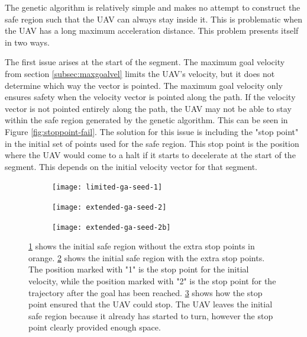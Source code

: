The genetic algorithm is relatively simple and makes no attempt to construct the safe region such that the UAV can always stay inside it. This is problematic when the UAV has a long maximum acceleration distance. This problem presents itself in two ways.
\par
The first issue arises at the start of the segment. The maximum goal velocity from section \ref{subsec:maxgoalvel} limits the UAV's velocity, but it does not determine which way the vector is pointed. The maximum goal velocity only ensures safety when the velocity vector is pointed along the path. If the velocity vector is not pointed entirely along the path, the UAV may not be able to stay within the safe region generated by the genetic algorithm. This can be seen in Figure \ref{fig:stoppoint-fail}. The solution for this issue is including the "stop point" in the initial set of points used for the safe region. This stop point is the position where the UAV would come to a halt if it starts to decelerate at the start of the segment. This depends on the initial velocity vector for that segment.
\par
\begin{figure}
	\centering
	\begin{subfigure}[t]{0.30\columnwidth}
        		\texttt{[image: limited-ga-seed-1]}
        		\caption{}
        		\label{fig:ga-seed-without}
	\end{subfigure}
	\hfill
	\begin{subfigure}[t]{0.30\columnwidth}
        		\texttt{[image: extended-ga-seed-2]}
        		\caption{}
        		 \label{fig:ga-seed-with}
	\end{subfigure}	
	\hfill
	\begin{subfigure}[t]{0.30\columnwidth}
        		\texttt{[image: extended-ga-seed-2b]}
        		\caption{}
        		 \label{fig:ga-seed-nomaxvela}
	\end{subfigure}		
	\caption[The effect of the inclusion of stop points on the initial convex safe region.]{\ref{fig:ga-seed-without} shows the initial safe region without the extra stop points in orange. \ref{fig:ga-seed-with} shows the initial safe region with the extra stop points. The position marked with "1" is the stop point for the initial velocity, while the position marked with "2" is the stop point for the trajectory after the goal has been reached. \ref{fig:ga-seed-nomaxvela} shows how the stop point ensured that the UAV could stop. The UAV leaves the initial safe region because it already has started to turn, however the stop point clearly provided enough space.}
    \label{fig:ga-seed-1}     
\end{figure}
